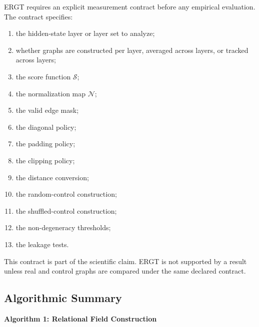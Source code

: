 \documentclass[11pt]{article}
\begin{document}
ERGT requires an explicit measurement contract before any empirical evaluation. The contract specifies:
\begin{enumerate}[label=(\roman*)]
    \item the hidden-state layer or layer set to analyze;
    \item whether graphs are constructed per layer, averaged across layers, or tracked across layers;
    \item the score function $\mathcal{S}$;
    \item the normalization map $\mathcal{N}$;
    \item the valid edge mask;
    \item the diagonal policy;
    \item the padding policy;
    \item the clipping policy;
    \item the distance conversion;
    \item the random-control construction;
    \item the shuffled-control construction;
    \item the non-degeneracy thresholds;
    \item the leakage tests.
\end{enumerate}

This contract is part of the scientific claim. ERGT is not supported by a result unless real and control graphs are compared under the same declared contract.

\subsection{Algorithmic Summary}

\noindent\textbf{Algorithm 1: Relational Field Construction}
\end{document}
